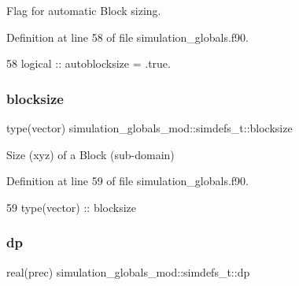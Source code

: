 Flag for automatic Block sizing. 



Definition at line 58 of file simulation\+\_\+globals.\+f90.


\begin{DoxyCode}
58         \textcolor{keywordtype}{logical}         ::  autoblocksize = .true.   
\end{DoxyCode}
\mbox{\label{structsimulation__globals__mod_1_1simdefs__t_a7ed40e8b9c4062d6e461b6187c3115b1}} 
\subsubsection{\texorpdfstring{blocksize}{blocksize}}
{\footnotesize\ttfamily type(vector) simulation\+\_\+globals\+\_\+mod\+::simdefs\+\_\+t\+::blocksize\hspace{0.3cm}{\ttfamily [private]}}



Size (xyz) of a Block (sub-\/domain) 



Definition at line 59 of file simulation\+\_\+globals.\+f90.


\begin{DoxyCode}
59         \textcolor{keywordtype}{type}(vector)    ::  blocksize
\end{DoxyCode}
\mbox{\label{structsimulation__globals__mod_1_1simdefs__t_af730c363daf57cdb66206b7cc7e3d8ff}} 
\subsubsection{\texorpdfstring{dp}{dp}}
{\footnotesize\ttfamily real(prec) simulation\+\_\+globals\+\_\+mod\+::simdefs\+\_\+t\+::dp\hspace{0.3cm}{\ttfamily [private]}}



